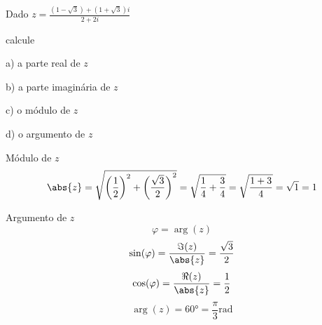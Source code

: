 \begin{question}
  Dado \(z=\frac{ \left(1-\sqrt{3}\right) + \left(1+\sqrt{3}\right)i}{2+2i} \)

  calcule

  a) a parte real de $z$

  b) a parte imaginária de $z$

  c) o módulo de $z$

  d) o argumento de $z$
\end{question}


\begin{resolution}{Módulo de $z$}
  \[
    \abs{z}
    = \sqrt{\left(\frac{1}{2}\right)^2 + \left(\frac{\sqrt{3}}{2}\right)^2}
    = \sqrt{\frac{1}{4} + \frac{3}{4}}
    = \sqrt{\frac{1+3}{4}}
    = \sqrt{1}
    = 1
  \]
\end{resolution}

\begin{resolution}{Argumento de $z$}
  \[
    \varphi=\arg(z)
  \]
  \[
    \sin(\varphi)
    = \frac{\Im(z)}{\abs{z}}
    = \frac{\sqrt{3}}{2}
  \]
  \[
    \cos(\varphi)
    = \frac{\Re(z)}{\abs{z}}
    = \frac{1}{2}
  \]
  \[
    \arg(z)
    = \ang{60}
    = \frac{\pi}{3} \text{rad}
  \]
\end{resolution}





